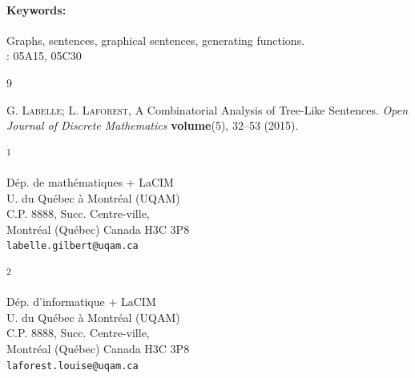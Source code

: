 \documentclass{article}
\newcommand{\ADDRESS}[2]{\noindent
  \textsuperscript{#1}\parbox[t]{0.9\textwidth}{#2} \vspace{6pt}}
\newcommand{\KEYWORDS}[1]{\paragraph{Keywords:} #1}
\begin{document}
\KEYWORDS {Graphs, sentences, graphical sentences, generating functions.}\\

: {05A15, 05C30}

\begin{thebibliography}{9}

 \textsc{G. Labelle; L. Laforest}, A Combinatorial Analysis of Tree-Like Sentences.
\emph{Open Journal of Discrete Mathematics} \textbf{volume}(5), 32--53  (2015).

\end{thebibliography}

\vspace{1cm}

\ADDRESS{1}{
D\'ep. de math\'ematiques + LaCIM  \\U. du Qu\'ebec \`a Montr\'eal (UQAM) \\
C.P. 8888, Succ. Centre-ville, \\
Montr\'eal (Qu\'ebec) Canada H3C 3P8\\
\texttt{labelle.gilbert@uqam.ca}
}

\vspace{.5cm}

\ADDRESS{2}{
D\'ep. d'informatique + LaCIM  \\U. du Qu\'ebec \`a Montr\'eal (UQAM) \\
C.P. 8888, Succ. Centre-ville, \\
Montr\'eal (Qu\'ebec) Canada H3C 3P8\\
\texttt{laforest.louise@uqam.ca}
}
\end{document}
